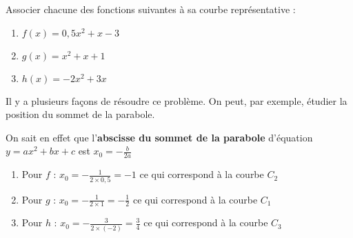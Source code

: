 
%
Associer chacune des fonctions suivantes à sa courbe représentative :
\begin{enumerate}
     \item
     $f\left(x\right) = 0,5 x^2 + x-3$
     \item
     $g\left(x\right) = x^{2} + x + 1$
     \item
     $h\left(x\right) = -2x^{2} + 3x$
\end{enumerate}

\begin{center}
\end{center}

\begin{corrige}
     Il y a plusieurs façons de résoudre ce problème. On peut, par exemple, étudier la position du sommet de la parabole.
     \par
     On sait en effet que l'\textbf{abscisse du sommet de la parabole} d'équation $y=ax^{2}+bx+c$ est $x_{0}=-\frac{b}{2a}$
     \begin{enumerate}
          \item
          Pour $f$ : $x_{0}=-\frac{1}{2\times 0,5}=-1$ ce qui correspond à la courbe $C_{2}$
          \item
          Pour $g$ : $x_{0}=-\frac{1}{2\times 1}=-\frac{1}{2}$ ce qui correspond à la courbe $C_{1}$
          \item
          Pour $h$ : $x_{0}=-\frac{3}{2\times \left(-2\right)}=\frac{3}{4}$ ce qui correspond à la courbe $C_{3}$
     \end{enumerate}
\end{corrige}
